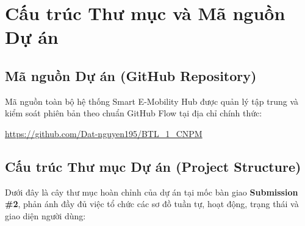 \documentclass[12pt,a4paper]{article}
\begin{document}
\appendix
\section{Cấu trúc Thư mục và Mã nguồn Dự án}

\subsection{Mã nguồn Dự án (GitHub Repository)}
Mã nguồn toàn bộ hệ thống Smart E-Mobility Hub được quản lý tập trung và kiểm soát phiên bản theo chuẩn GitHub Flow tại địa chỉ chính thức:
\begin{center}
    \url{https://github.com/Dat-nguyen195/BTL_1_CNPM}
\end{center}

\subsection{Cấu trúc Thư mục Dự án (Project Structure)}
Dưới đây là cây thư mục hoàn chỉnh của dự án tại mốc bàn giao \textbf{Submission \#2}, phản ánh đầy đủ việc tổ chức các sơ đồ tuần tự, hoạt động, trạng thái và giao diện người dùng:
\end{document}
